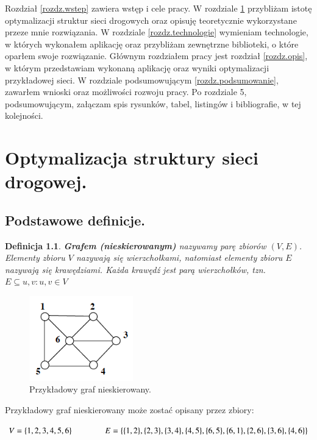 \documentclass[twoside,12pt]{report}
\let\oldsection\chapter
\def\chapter{\cleardoublepage\oldsection}
\newtheorem{definition}{Definicja} %
\begin{document}
Rozdział \ref{rozdz.wstep} zawiera wstęp i cele pracy. W rozdziale \ref{rozdz.optymalizacja} przybliżam istotę optymalizacji struktur sieci drogowych
oraz opisuję teoretycznie wykorzystane przeze mnie rozwiązania. W rozdziale \ref{rozdz.technologie} wymieniam technologie, w których wykonałem aplikację oraz przybliżam zewnętrzne biblioteki, o które oparłem swoje rozwiązanie. Głównym rozdziałem pracy jest rozdział \ref{rozdz.opis},
w którym przedstawiam wykonaną aplikację oraz wyniki optymalizacji przykładowej sieci. W rozdziale podsumowującym \ref{rozdz.podsumowanie}, zawarłem wnioski oraz możliwości rozwoju pracy. Po rozdziale 5, podsumowującym, załączam spis rysunków, tabel, listingów i bibliografie, w tej kolejności.

\chapter{Optymalizacja struktury sieci drogowej.}\label{rozdz.optymalizacja} 
\section{Podstawowe definicje.}

\begin{definition}\label{Graf nieskierowany}
\textbf{Grafem (nieskierowanym)} nazywamy parę zbiorów $(V,E)$. Elementy zbioru $V$ nazywają się \textit{wierzchołkami}, natomiast elementy zbioru $E$ nazywają się \textit{krawędziami}. Każda krawędź jest parą wierzchołków, tzn. $E \subseteq {{u,v}:u,v \in V}$
\end{definition}

\begin{figure}[ht]
\begin{center}
\includegraphics[width=0.40\textwidth]{img/graf1}
\caption{Przykładowy graf nieskierowany\cite{grafy}.} 
\end{center}
\end{figure}

Przykładowy graf nieskierowany może zostać opisany przez zbiory:
\begin{center}
\begin{math}
V=\{1,2,3,4,5,6\} \hspace*{40px} E=\{\{1,2\},\{2,3\},\{3,4\},\{4,5\},\{6,5\},\{6,1\},\{2,6\},\{3,6\},\{4,6\}\}
\end{math}
\end{center}
\end{document}
